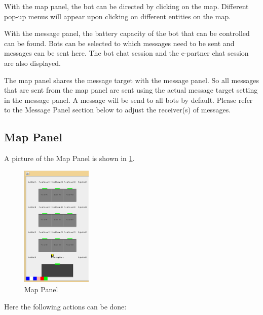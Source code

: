 With the map panel, the bot can be directed by clicking on the map. Different pop-up menus will appear upon clicking on different entities on the map.

With the message panel, the battery capacity of the bot that can be controlled can be found. Bots can be selected to which messages need to be sent and messages can be sent here. The bot chat session and the e-partner chat session are also displayed.

The map panel shares the message target with the message panel. So all messages that are sent from the map panel are sent using the actual message target setting in the message panel. A message will be send to all bots by default. Please refer to the Message Panel section below to adjust the receiver(s) of messages.

\subsection{Map Panel}
A picture of the Map Panel is shown in \ref{fig:mapPanel}.

\begin{figure}[h]
\begin{center}
\includegraphics[width= 0.3\textwidth]{HumanPlayerGUI/hpg-left.png}
\end{center}
\caption{Map Panel}
\label{fig:mapPanel}
\end{figure}

Here the following actions can be done:

